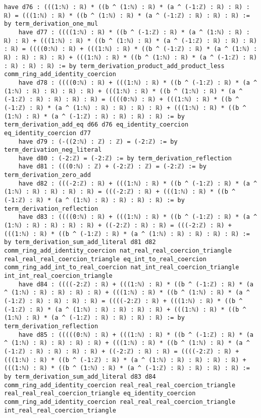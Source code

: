 \documentclass{article}
\begin{document}
\begin{tcolorbox}[colback=white!10, width=\linewidth]
\begin{lstlisting}[language=Lean4]
    have d76 : (((1:ℕ) : ℝ) * ((b ^ (1:ℕ) : ℝ) * (a ^ (-1:ℤ) : ℝ) : ℝ) : ℝ) = (((1:ℕ) : ℝ) * ((b ^ (1:ℕ) : ℝ) * (a ^ (-1:ℤ) : ℝ) : ℝ) : ℝ) := by term_derivation_one_mul
    have d77 : ((((1:ℕ) : ℝ) * ((b ^ (-1:ℤ) : ℝ) * (a ^ (1:ℕ) : ℝ) : ℝ) : ℝ) + (((1:ℕ) : ℝ) * ((b ^ (1:ℕ) : ℝ) * (a ^ (-1:ℤ) : ℝ) : ℝ) : ℝ) : ℝ) = ((((0:ℕ) : ℝ) + (((1:ℕ) : ℝ) * ((b ^ (-1:ℤ) : ℝ) * (a ^ (1:ℕ) : ℝ) : ℝ) : ℝ) : ℝ) + (((1:ℕ) : ℝ) * ((b ^ (1:ℕ) : ℝ) * (a ^ (-1:ℤ) : ℝ) : ℝ) : ℝ) : ℝ) := by term_derivation_product_add_product_less comm_ring_add_identity_coercion
    have d78 : ((((0:ℕ) : ℝ) + (((1:ℕ) : ℝ) * ((b ^ (-1:ℤ) : ℝ) * (a ^ (1:ℕ) : ℝ) : ℝ) : ℝ) : ℝ) + (((1:ℕ) : ℝ) * ((b ^ (1:ℕ) : ℝ) * (a ^ (-1:ℤ) : ℝ) : ℝ) : ℝ) : ℝ) = ((((0:ℕ) : ℝ) + (((1:ℕ) : ℝ) * ((b ^ (-1:ℤ) : ℝ) * (a ^ (1:ℕ) : ℝ) : ℝ) : ℝ) : ℝ) + (((1:ℕ) : ℝ) * ((b ^ (1:ℕ) : ℝ) * (a ^ (-1:ℤ) : ℝ) : ℝ) : ℝ) : ℝ) := by term_derivation_add_eq d66 d76 eq_identity_coercion eq_identity_coercion d77
    have d79 : (-((2:ℕ) : ℤ) : ℤ) = (-2:ℤ) := by term_derivation_neg_literal
    have d80 : (-2:ℤ) = (-2:ℤ) := by term_derivation_reflection
    have d81 : (((0:ℕ) : ℤ) + (-2:ℤ) : ℤ) = (-2:ℤ) := by term_derivation_zero_add
    have d82 : (((-2:ℤ) : ℝ) + (((1:ℕ) : ℝ) * ((b ^ (-1:ℤ) : ℝ) * (a ^ (1:ℕ) : ℝ) : ℝ) : ℝ) : ℝ) = (((-2:ℤ) : ℝ) + (((1:ℕ) : ℝ) * ((b ^ (-1:ℤ) : ℝ) * (a ^ (1:ℕ) : ℝ) : ℝ) : ℝ) : ℝ) := by term_derivation_reflection
    have d83 : ((((0:ℕ) : ℝ) + (((1:ℕ) : ℝ) * ((b ^ (-1:ℤ) : ℝ) * (a ^ (1:ℕ) : ℝ) : ℝ) : ℝ) : ℝ) + ((-2:ℤ) : ℝ) : ℝ) = (((-2:ℤ) : ℝ) + (((1:ℕ) : ℝ) * ((b ^ (-1:ℤ) : ℝ) * (a ^ (1:ℕ) : ℝ) : ℝ) : ℝ) : ℝ) := by term_derivation_sum_add_literal d81 d82 comm_ring_add_identity_coercion nat_real_real_coercion_triangle real_real_real_coercion_triangle eq_int_to_real_coercion comm_ring_add_int_to_real_coercion nat_int_real_coercion_triangle int_int_real_coercion_triangle
    have d84 : ((((-2:ℤ) : ℝ) + (((1:ℕ) : ℝ) * ((b ^ (-1:ℤ) : ℝ) * (a ^ (1:ℕ) : ℝ) : ℝ) : ℝ) : ℝ) + (((1:ℕ) : ℝ) * ((b ^ (1:ℕ) : ℝ) * (a ^ (-1:ℤ) : ℝ) : ℝ) : ℝ) : ℝ) = ((((-2:ℤ) : ℝ) + (((1:ℕ) : ℝ) * ((b ^ (-1:ℤ) : ℝ) * (a ^ (1:ℕ) : ℝ) : ℝ) : ℝ) : ℝ) + (((1:ℕ) : ℝ) * ((b ^ (1:ℕ) : ℝ) * (a ^ (-1:ℤ) : ℝ) : ℝ) : ℝ) : ℝ) := by term_derivation_reflection
    have d85 : (((((0:ℕ) : ℝ) + (((1:ℕ) : ℝ) * ((b ^ (-1:ℤ) : ℝ) * (a ^ (1:ℕ) : ℝ) : ℝ) : ℝ) : ℝ) + (((1:ℕ) : ℝ) * ((b ^ (1:ℕ) : ℝ) * (a ^ (-1:ℤ) : ℝ) : ℝ) : ℝ) : ℝ) + ((-2:ℤ) : ℝ) : ℝ) = ((((-2:ℤ) : ℝ) + (((1:ℕ) : ℝ) * ((b ^ (-1:ℤ) : ℝ) * (a ^ (1:ℕ) : ℝ) : ℝ) : ℝ) : ℝ) + (((1:ℕ) : ℝ) * ((b ^ (1:ℕ) : ℝ) * (a ^ (-1:ℤ) : ℝ) : ℝ) : ℝ) : ℝ) := by term_derivation_sum_add_literal d83 d84 comm_ring_add_identity_coercion real_real_real_coercion_triangle real_real_real_coercion_triangle eq_identity_coercion comm_ring_add_identity_coercion real_real_real_coercion_triangle int_real_real_coercion_triangle

\end{lstlisting}
\end{tcolorbox}
\end{document}
